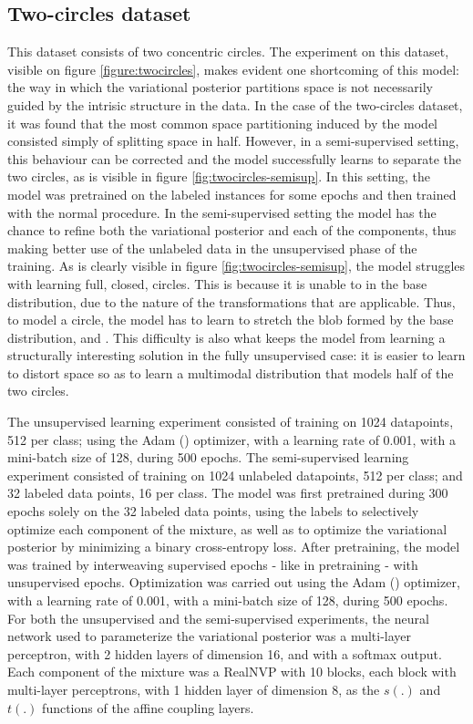 \subsection{Two-circles dataset}
This dataset consists of two concentric circles. The experiment on this dataset,
visible on figure \ref{figure:twocircles}, makes evident one shortcoming of this
model: the way in which the variational posterior partitions space is
not necessarily guided by the intrisic structure in the data. In the case of
the two-circles dataset, it was found that the most common space partitioning
induced by the model consisted simply of splitting space in half. However, in
a semi-supervised setting, this behaviour can be corrected and the model
successfully learns to separate the two circles, as is visible in figure
\ref{fig:twocircles-semisup}. In this setting, the model was pretrained on
the labeled instances for some epochs and then trained with the normal procedure.
In the semi-supervised setting the model has the chance to refine both the
variational posterior and each of the components, thus making better use of
the unlabeled data in the unsupervised phase of the training. As is clearly
visible in figure \ref{fig:twocircles-semisup}, the model struggles with
learning full, closed, circles. This is because it is unable to 
in the base distribution, due to the nature of the transformations that are
applicable. Thus, to model a circle, the model has to learn to stretch the blob
formed by the base distribution, and . This difficulty
is also what keeps the model from learning a structurally interesting solution
in the fully unsupervised case: it is easier to learn to distort space so as to
learn a multimodal distribution that models half of the two circles.

The unsupervised learning experiment consisted of training on 1024 datapoints,
512 per class; using the Adam (\autocite{adam}) optimizer, with a learning rate
of 0.001, with a mini-batch size of 128, during 500 epochs.
The semi-supervised learning experiment consisted of training on 1024 unlabeled
datapoints, 512 per class; and 32 labeled data points, 16 per class. The model
was first pretrained during 300 epochs solely on the 32 labeled data points, using
the labels to selectively optimize each component of the mixture, as well as
to optimize the variational posterior by minimizing a binary cross-entropy loss.
After pretraining, the model was trained by interweaving supervised epochs - like
in pretraining - with unsupervised epochs. Optimization was carried out using the
Adam (\autocite{adam}) optimizer, with a learning rate of 0.001, with a mini-batch size
of 128, during 500 epochs.
For both the unsupervised and the semi-supervised experiments, the neural network
used to parameterize the variational posterior was a multi-layer perceptron, with
2 hidden layers of dimension 16, and with a softmax output. Each component of the
mixture was a RealNVP with 10 blocks, each block with multi-layer perceptrons,
with 1 hidden layer of dimension 8, as the $s(.)$ and $t(.)$ functions of the
affine coupling layers.

